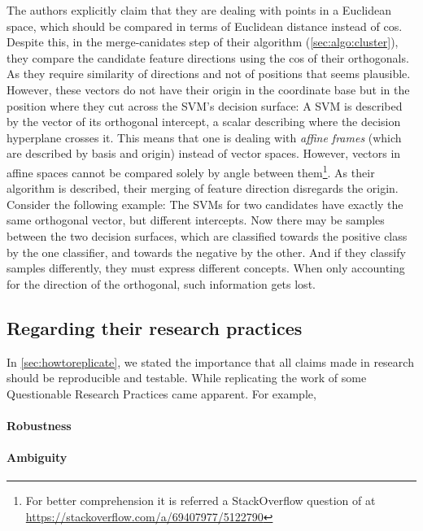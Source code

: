 The authors explicitly claim that they are dealing with points in a Euclidean space, which should be compared in terms of Euclidean distance \cite[14]{Derrac2015} instead of \gls{cos}. Despite this, in the merge-canidates step of their algorithm (\autoref{sec:algo:cluster}), they compare the candidate feature directions using the \gls{cos} of their orthogonals. As they require similarity of directions and not of positions that seems plausible. However, these vectors do not have their origin in the coordinate base but in the position where they cut across the SVM's decision surface: A SVM is described by the vector of its orthogonal intercept, a scalar describing where the decision hyperplane crosses it. This means that one is dealing with \textit{affine frames} (which are described by basis and origin) instead of vector spaces. However, vectors in affine spaces cannot be compared solely by angle between them\footnote{For better comprehension it is referred a StackOverflow question of \me at \url{https://stackoverflow.com/a/69407977/5122790}}. As their algorithm is described, their merging of feature direction disregards the origin. Consider the following example: The SVMs for two candidates have exactly the same orthogonal vector, but different intercepts. Now there may be samples between the two decision surfaces, which are classified towards the positive class by the one classifier, and towards the negative by the other. And if they classify samples differently, they must express different concepts. When only accounting for the direction of the orthogonal, such information gets lost.



\subsection{Regarding their research practices}

In \autoref{sec:howtoreplicate}, we stated the importance that all claims made in research should be reproducible and testable. While replicating the work of \cite{Derrac2015}some Questionable Research Practices came apparent. For example, 



\paragraph{Robustness}
\todo

\paragraph{Ambiguity}
\todo





